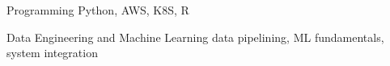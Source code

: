

\begin{cvskills}

  \cvskill
    {Programming} %
    {Python, AWS, K8S, R} %

  \cvskill
    {Data Engineering and Machine Learning} %
    {data pipelining, ML fundamentals, system integration} %

\end{cvskills}

